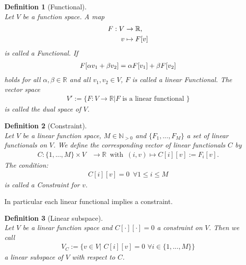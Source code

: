 \documentclass[a4paper,11pt]{article}
\numberwithin{equation}{section}
\newtheorem{definition}{Definition}[section]
\newcommand{\theoremNewline}{\hspace{1mm}\\}
\newcommand{\theoremEndLine}{\hspace{1mm}}
\newcommand{\komma}{\text{,}}
\newcommand{\R}{\mathbb{R}}
\begin{document}
    \begin{definition}[Functional]\theoremNewline
      \label{definition::analytical_concept::functional}
      Let $V$ be a function space. A map
      \begin{align}
        F: V &\rightarrow \R\komma
          \notag\\
        v &\mapsto F[v]
      \end{align}
      is called a \textnormal{Functional}. If
      \begin{align}
        F[\alpha v_1 + \beta v_2] = \alpha F[v_1] + \beta F[v_2]
          \notag
      \end{align}
      holds for all ${\alpha,\beta \in \R}$ and all ${v_1,v_2\in V}$, $F$ is called a \textnormal{linear Functional}.
      The vector space
      \begin{align}
        V' := \big\{ F : V \rightarrow \R \big| F \text{ is a linear functional } \big\}
      \end{align}
      is called the dual space of $V$.
    \end{definition}\theoremEndLine

    \begin{definition}[Constraint]\theoremNewline
      \label{definition::analytical_concept::constraint}
      Let $V$ be a linear function space, $M \in \mathbb{N}_{>0}$ and $\{ F_1, ..., F_M \}$ a set of linear
      functionals on $V$. We define the corresponding vector of linear functionals $C$ by
      \begin{align}
        C: \{1,...,M\} \times V &\rightarrow \R \enspace \mbox{with} \enspace (i,v) \mapsto C[i][v] := F_i[v].
      \end{align}
      The condition:
        \begin{align}
        C[i][v] = 0 \enspace \forall 1 \le i \le M
        \end{align}
      is called a \textnormal{Constraint} for $v$.
    \end{definition}

    In particular each linear functional implies a constraint.

    \begin{definition}[Linear subspace]\theoremNewline
      \label{definition::analytical_concept::linear_subspace}
      Let $V$ be a linear function space and $C[\cdot][\cdot]=0$ a constraint on $V$. Then we call
      \begin{align}
        V_C := \{ v \in V| \hspace{4pt} C[i][v] = 0 \hspace{4pt}\forall i\in\{1,...,M\}\}
      \end{align}
      a \textnormal{linear subspace} of $V$ with respect to $C$.
    \end{definition}
\end{document}
